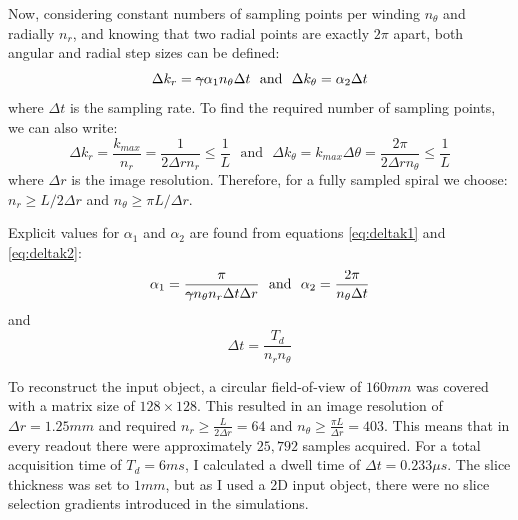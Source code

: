 Now, considering constant numbers of sampling points per winding $n_{\theta}$ and radially $n_r$, and knowing that two radial points are exactly $2\pi$ apart, both angular and radial step sizes can be defined:
\begin{equation}\label{eq:deltak1}
    \Delta k_r = \text{\sout{$\gamma$}} \alpha_1 n_{\theta} \Delta t  \, \, \text{  and  } \, \, \Delta k_{\theta} = \alpha_2 \Delta t
\end{equation}
where $\Delta t$ is the sampling rate.
To find the required number of sampling points, we can also write:
\begin{equation}\label{eq:deltak2}
    \Delta k_r = \frac{k_{max}}{n_r} = \frac{1}{2 \Delta r n_r} \leq \frac{1}{L} \, \, \text{  and  } \, \,  \Delta k_{\theta} = k_{max} \Delta \theta = \frac{2 \pi}{2 \Delta r n_{\theta}} \leq \frac{1}{L} 
\end{equation}
where $\Delta r$ is the image resolution.
Therefore, for a fully sampled spiral we choose: $n_r \geq L / 2 \Delta r$ and $n_{\theta} \geq \pi L / \Delta r$.

\hfill

Explicit values for $\alpha_1$ and $\alpha_2$ are found from equations \ref{eq:deltak1} and \ref{eq:deltak2}:
\begin{equation}
    \alpha_1 = \frac{\pi}{\text{\sout{$\gamma$}} n_{\theta} n_r \Delta t \Delta r}  \, \, \text{  and  } \, \, \alpha_2 = \frac{2 \pi}{n_{\theta} \Delta t}
\end{equation}
and
\begin{equation}
    \Delta t = \frac{T_d}{n_r n_{\theta}}
\end{equation}

\hfill

To reconstruct the input object, a circular field-of-view of $160mm$ was covered with a matrix size of $128 \times 128$.
This resulted in an image resolution of $\Delta r = 1.25mm$ and required
$n_r \geq \frac{L}{2 \Delta r} = 64$ and
$n_{\theta} \geq \frac{\pi L}{\Delta r} = 403$.
This means that in every readout there were approximately $25,792$ samples acquired.
For a total acquisition time of $T_d = 6ms$, I calculated a dwell time of $\Delta t = 0.233 \mu s$.
The slice thickness was set to $1mm$, but as I used a 2D input object, there were no slice selection gradients introduced in the simulations.

